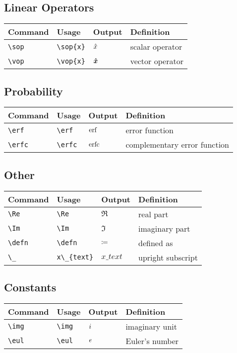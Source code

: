 \documentclass[11pt]{article}
\begin{document}
\subsection{Linear Operators}

\begin{tabular}{llll}
    Command     & Usage          & Output    & Definition      \\
    \hline
    \verb|\sop| & \verb|\sop{x}| & $\hat{x}$ & scalar operator \\
    \verb|\vop| & \verb|\vop{x}| & $\bm{\hat{x}}$ & vector operator \\
\end{tabular}

\subsection{Probability}

\begin{tabular}{llll}
    Command      & Usage        & Output  & Definition                   \\
    \hline
    \verb|\erf|  & \verb|\erf|  & $\operatorname{erf}$  & error function               \\
    \verb|\erfc| & \verb|\erfc| & $\operatorname{erfc}$ & complementary error function \\
\end{tabular}

\subsection{Other}

\begin{tabular}{llll}
    Command      & Usage            & Output      & Definition        \\
    \hline
    \verb|\Re|   & \verb|\Re|       & $\Re$       & real part         \\
    \verb|\Im|   & \verb|\Im|       & $\Im$       & imaginary part    \\
    \verb|\defn| & \verb|\defn|     & $\coloneq$     & defined as        \\
    \verb|\_|    & \verb|x\_{text}| & $x\_{text}$ & upright subscript \\
\end{tabular}

\subsection{Constants}

\begin{tabular}{llll}
    Command     & Usage       & Output & Definition     \\
    \hline
    \verb|\img| & \verb|\img| & $i$ & imaginary unit \\
    \verb|\eul| & \verb|\eul| & $e$ & Euler's number \\
\end{tabular}
\end{document}
